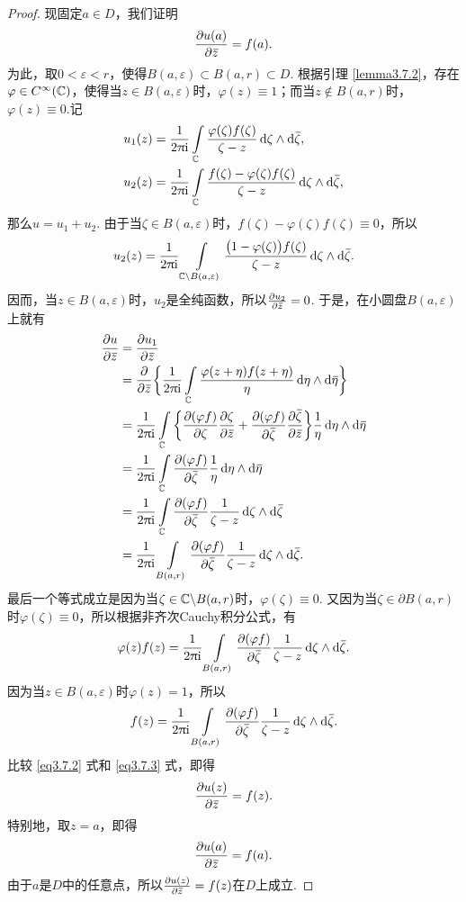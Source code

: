 \begin{proof}
  现固定$a\in D$，我们证明
  \[
    \frac{\partial u(a)}{\partial {}\mkern2mu\overline{\mkern-2muz}} = f(a).
  \]
  为此，取$0<\varepsilon<r$，使得$B(a,\varepsilon)\subset B(a,r)\subset D$. 根据引理 \ref{lemma3.7.2}，存在$\varphi\in C^\infty(\mathbb C)$，使得当$z\in B(a,\varepsilon)$时，$\varphi(z)\equiv1$；而当$z\notin B(a,r)$时，$\varphi(z)\equiv0$.记
  \begin{align*}
    & u_1(z) = \frac1{2\uppi\mathrm i}\int\limits_\mathbb C\frac{\varphi(\zeta)f(\zeta)}{\zeta-z}\mathop{}\!\mathrm{d} \zeta\wedge\mathop{}\!\mathrm{d} {}\mkern2mu\overline{\mkern-2mu\zeta},\\
    & u_2(z) = \frac1{2\uppi\mathrm i}\int\limits_\mathbb C\frac{f(\zeta)-\varphi(\zeta)f(\zeta)}{\zeta-z}\mathop{}\!\mathrm{d} \zeta\wedge\mathop{}\!\mathrm{d} {}\mkern2mu\overline{\mkern-2mu\zeta},
  \end{align*}
  那么$u=u_1+u_2$. 由于当$\zeta\in B(a,\varepsilon)$时，$f(\zeta)-\varphi(\zeta)f(\zeta)\equiv0$，所以
  \[
    u_2(z) = \frac1{2\uppi\mathrm i}\int\limits_{\mathbb C\backslash B(a,\varepsilon)}\frac{\big(1-\varphi(\zeta)\big)f(\zeta)}{\zeta-z}\mathop{}\!\mathrm{d} \zeta\wedge\mathop{}\!\mathrm{d} {}\mkern2mu\overline{\mkern-2mu\zeta}.
  \]
  因而，当$z\in B(a,\varepsilon)$时，$u_2$是全纯函数，所以$\frac{\partial u_2}{\partial {}\mkern2mu\overline{\mkern-2muz}}=0$. 于是，在小圆盘$B(a,\varepsilon)$上就有
  \begin{equation}\label{eq3.7.2}
    \begin{aligned}
      \pp u{\bar z} & = \pp{u_1}{\bar z}\\
      & = \pp{}{\bar z}\bigg\{\frac1{2\pi\ii}\int\limits_\MC\frac{\varphi(z+\eta)f(z+\eta)}\eta\dif \eta\wedge\dif \bar\eta\bigg\}\\
      & = \frac1{2\pi\ii}\int\limits_\MC\bigg\{\pp{(\varphi f)}\zeta\pp\zeta{\bar z}+
      \pp{(\varphi f)}{\bar \zeta}\pp{\bar \zeta}{\bar z}\bigg\}\frac1\eta\dif \eta\wedge\dif \bar\eta\\
      & = \frac1{2\pi\ii}\int\limits_\MC\pp{(\varphi f)}{\bar\zeta}\frac1\eta\dif \eta\wedge\dif \bar\eta\\
      & = \frac1{2\pi\ii}\int\limits_\MC\pp{(\varphi f)}{\bar\zeta}\frac1{\zeta-z}\dif \zeta\wedge\dif \bar\zeta\\
      & = \frac1{2\pi\ii}\int\limits_{B(a,r)}\pp{(\varphi f)}{\bar\zeta}\frac1{\zeta-z}
      \dif \zeta\wedge\dif \bar\zeta.
    \end{aligned}
  \end{equation}
  最后一个等式成立是因为当$\zeta\in\mathbb C\backslash B(a,r)$时，$\varphi(\zeta)\equiv0$. 又因为当$\zeta\in\partial B(a,r)$时$\varphi(\zeta)\equiv0$，所以根据非齐次Cauchy积分公式，有
  \[
    \varphi(z)f(z)=\frac1{2\uppi\mathrm i}\int\limits_{B(a,r)}\frac{\partial (\varphi f)}{\partial {}\mkern2mu\overline{\mkern-2mu\zeta}}
    \frac1{\zeta-z}\mathop{}\!\mathrm{d} \zeta\wedge\mathop{}\!\mathrm{d} {}\mkern2mu\overline{\mkern-2mu\zeta}.
  \]
  因为当$z\in B(a,\varepsilon)$时$\varphi(z)=1$，所以
  \begin{equation}\label{eq3.7.3}
    f(z) = \frac1{2\uppi\mathrm i}\int\limits_{B(a,r)}\frac{\partial (\varphi f)}{\partial {}\mkern2mu\overline{\mkern-2mu\zeta}}
    \frac1{\zeta-z}\mathop{}\!\mathrm{d} \zeta\wedge\mathop{}\!\mathrm{d} {}\mkern2mu\overline{\mkern-2mu\zeta}.
  \end{equation}
  比较 \eqref{eq3.7.2} 式和 \eqref{eq3.7.3} 式，即得
  \[
    \frac{\partial u(z)}{\partial {}\mkern2mu\overline{\mkern-2muz}} = f(z).
  \]
  特别地，取$z=a$，即得
  \[
    \frac{\partial u(a)}{\partial {}\mkern2mu\overline{\mkern-2muz}} = f(a).
  \]
  由于$a$是$D$中的任意点，所以$\frac{\partial u(z)}{\partial {}\mkern2mu\overline{\mkern-2muz}}=f(z)$在$D$上成立.
\end{proof}

